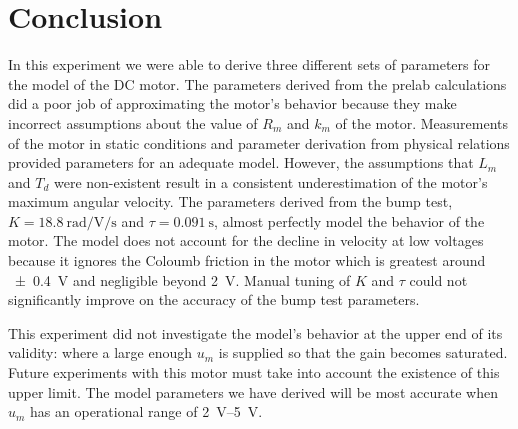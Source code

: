 \section{Conclusion}\label{sec:conclusion}
In this experiment we were able to derive three different sets of parameters for the model of the DC motor.
The parameters derived from the prelab calculations did a poor job of approximating the motor's behavior because they make incorrect assumptions about the value of $R_m$ and $k_m$ of the motor.
Measurements of the motor in static conditions and parameter derivation from physical relations provided parameters for an adequate model.
However, the assumptions that $L_m$ and $T_d$ were non-existent result in a consistent underestimation of the motor's maximum angular velocity.
The parameters derived from the bump test, $K = \SI{18.8}{\radian\per\volt\per\second}$ and $\tau = \SI{0.091}{\second}$, almost perfectly model the behavior of the motor.
The model does not account for the decline in velocity at low voltages because it ignores the Coloumb friction in the motor which is greatest around \SI{\pm 0.4}{\volt} and negligible beyond \SI{2}{\volt}.
Manual tuning of $K$ and $\tau$ could not significantly improve on the accuracy of the bump test parameters.

This experiment did not investigate the model's behavior at the upper end of its validity: where a large enough $u_m$ is supplied so that the gain becomes saturated.
Future experiments with this motor must take into account the existence of this upper limit.
The model parameters we have derived will be most accurate when $u_m$ has an operational range of \SIrange{2}{5}{\volt}.

